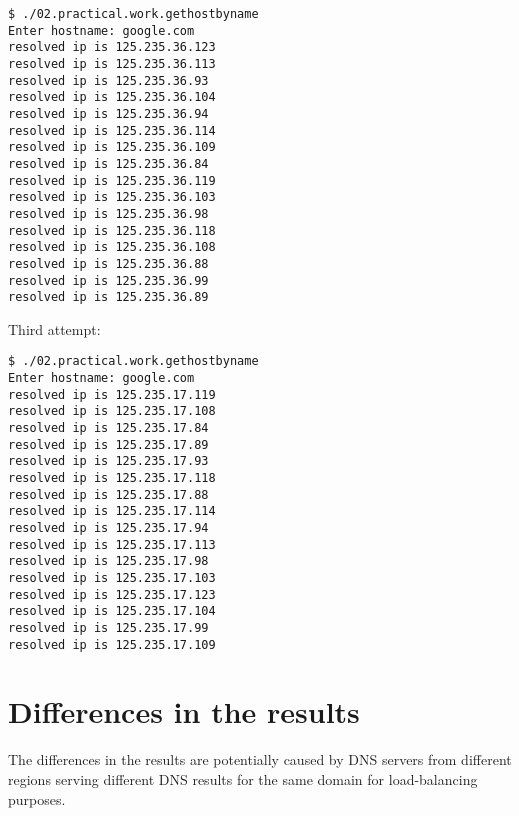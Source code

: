 \documentclass[12pt]{article}
\begin{document}
\begin{lstlisting}[breaklines]
$ ./02.practical.work.gethostbyname
Enter hostname: google.com
resolved ip is 125.235.36.123
resolved ip is 125.235.36.113
resolved ip is 125.235.36.93
resolved ip is 125.235.36.104
resolved ip is 125.235.36.94
resolved ip is 125.235.36.114
resolved ip is 125.235.36.109
resolved ip is 125.235.36.84
resolved ip is 125.235.36.119
resolved ip is 125.235.36.103
resolved ip is 125.235.36.98
resolved ip is 125.235.36.118
resolved ip is 125.235.36.108
resolved ip is 125.235.36.88
resolved ip is 125.235.36.99
resolved ip is 125.235.36.89
\end{lstlisting}

Third attempt:

\begin{lstlisting}[breaklines]
$ ./02.practical.work.gethostbyname
Enter hostname: google.com
resolved ip is 125.235.17.119
resolved ip is 125.235.17.108
resolved ip is 125.235.17.84
resolved ip is 125.235.17.89
resolved ip is 125.235.17.93
resolved ip is 125.235.17.118
resolved ip is 125.235.17.88
resolved ip is 125.235.17.114
resolved ip is 125.235.17.94
resolved ip is 125.235.17.113
resolved ip is 125.235.17.98
resolved ip is 125.235.17.103
resolved ip is 125.235.17.123
resolved ip is 125.235.17.104
resolved ip is 125.235.17.99
resolved ip is 125.235.17.109
\end{lstlisting}


\section{Differences in the results}

The differences in the results are potentially caused by DNS servers from different regions serving different DNS results for the same domain for load-balancing purposes.

\end{document}
